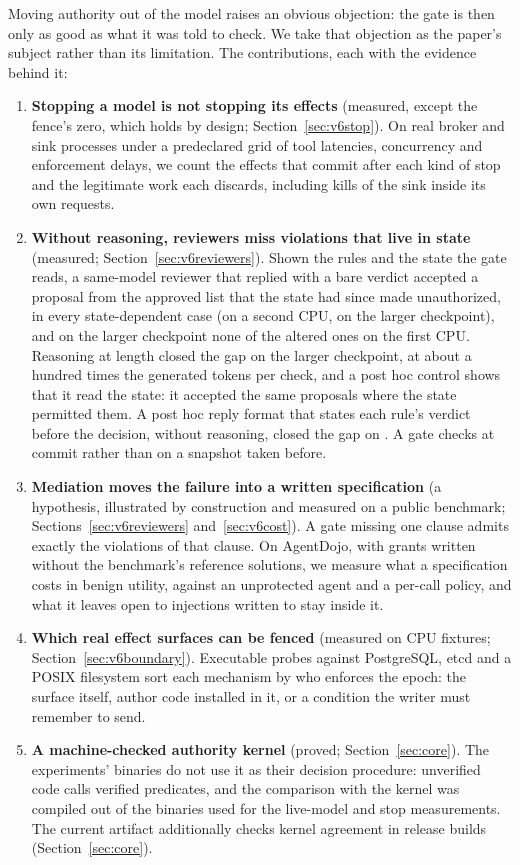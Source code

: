 Moving authority out of the model raises an obvious objection: the gate is then only as good as what it was told to
check. We take that objection as the paper's subject rather than its limitation. The contributions, each with the
evidence behind it:
\begin{enumerate}
  \item \textbf{Stopping a model is not stopping its effects} (measured, except the fence's zero, which holds by
        design; Section~\ref{sec:v6stop}). On real broker and
        sink processes under a predeclared grid of tool latencies, concurrency and enforcement delays, we count the
        effects that commit after each kind of stop and the legitimate work each discards, including kills of the
        sink inside its own requests.
  \item \textbf{Without reasoning, reviewers miss violations that live in state} (measured; Section~\ref{sec:v6reviewers}). Shown
        the rules and the state the gate reads, a same-model reviewer that replied with a bare verdict accepted a
        proposal from the approved list that the state had since made unauthorized, in every state-dependent case (on a second CPU, \vsixEFiveCROneSecondHost{} on the larger checkpoint), and on the
        larger checkpoint none of the altered ones on the first CPU. Reasoning at length closed the gap on the larger checkpoint, at about a hundred
        times the generated tokens per check, and a post hoc control shows that it read the state: it accepted the
        same proposals where the state permitted them. A post hoc reply format that states each rule's verdict before the
        decision, without reasoning, closed the gap on \vsixEFiveDClosed. A gate checks at commit rather than on a
        snapshot taken before.
  \item \textbf{Mediation moves the failure into a written specification} (a hypothesis, illustrated by
        construction and measured on a public benchmark; Sections~\ref{sec:v6reviewers} and~\ref{sec:v6cost}). A gate
        missing one clause admits exactly the violations of that clause. On AgentDojo, with grants written without the
        benchmark's reference solutions, we measure what a specification costs in benign utility, against an
        unprotected agent and a per-call policy, and what it leaves open to injections written to stay inside it.
  \item \textbf{Which real effect surfaces can be fenced} (measured on CPU fixtures; Section~\ref{sec:v6boundary}).
        Executable probes against PostgreSQL, etcd and a POSIX filesystem sort each mechanism by who enforces the
        epoch: the surface itself, author code installed in it, or a condition the writer must remember to send.
  \item \textbf{A machine-checked authority kernel} (proved; Section~\ref{sec:core}). The experiments' binaries do not
        use it as their decision procedure: unverified code calls verified predicates, and the comparison with the
        kernel was compiled out of the binaries used for the live-model and stop measurements. The current artifact
        additionally checks kernel agreement in release builds (Section~\ref{sec:core}).
\end{enumerate}
